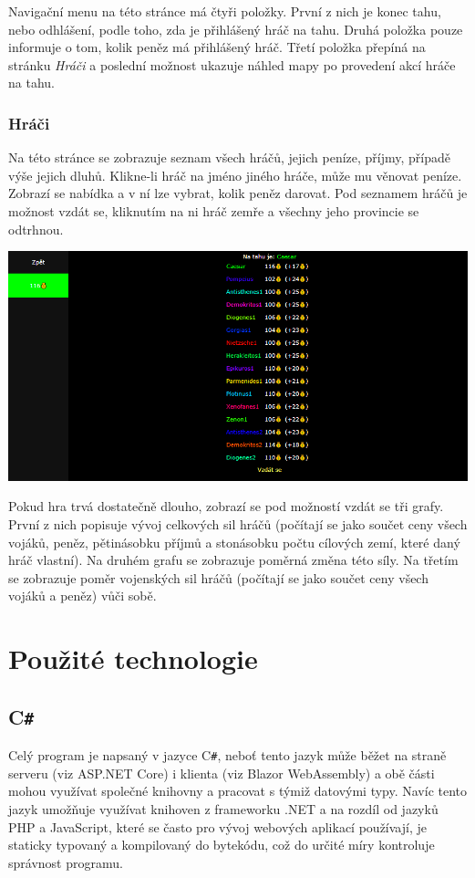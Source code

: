 \documentclass[a4paper,12pt]{article}
\def\CS{C\texttt{\#}}
\begin{document}
Navigační menu na této stránce má čtyři položky. První z nich je konec tahu, nebo odhlášení, podle toho, zda je přihlášený hráč na tahu. Druhá položka pouze informuje o tom, kolik peněz má přihlášený hráč. Třetí položka přepíná na stránku \textit{Hráči} a poslední možnost ukazuje náhled mapy po provedení akcí hráče na tahu.
\subsubsection{Hráči}
Na této stránce se zobrazuje seznam všech hráčů, jejich peníze, příjmy, případě výše jejich dluhů. Klikne-li hráč na jméno jiného hráče, může mu věnovat peníze. Zobrazí se nabídka a v ní lze vybrat, kolik peněz darovat. Pod seznamem hráčů je možnost vzdát se, kliknutím na ni hráč zemře a všechny jeho provincie se odtrhnou.

\includegraphics[width=\textwidth]{Players.png}

Pokud hra trvá dostatečně dlouho, zobrazí se pod možností vzdát se tři grafy. První z nich popisuje vývoj celkových sil hráčů (počítají se jako součet ceny všech vojáků, peněz, pětinásobku příjmů a stonásobku počtu cílových zemí, které daný hráč vlastní). Na druhém grafu se zobrazuje poměrná změna této síly. Na třetím se zobrazuje poměr vojenských sil hráčů (počítají se jako součet ceny všech vojáků a peněz) vůči sobě.

\section{Použité technologie}
\subsection{\CS{}}
Celý program je napsaný v jazyce \CS{}, neboť tento jazyk může běžet na straně serveru (viz ASP.NET Core) i klienta (viz Blazor WebAssembly) a obě části mohou využívat společné knihovny a pracovat s týmiž datovými typy. Navíc tento jazyk umožňuje využívat knihoven z frameworku .NET a na rozdíl od jazyků PHP a JavaScript, které se často pro vývoj webových aplikací používají, je staticky typovaný a kompilovaný do bytekódu, což do určité míry kontroluje správnost programu.
\end{document}
